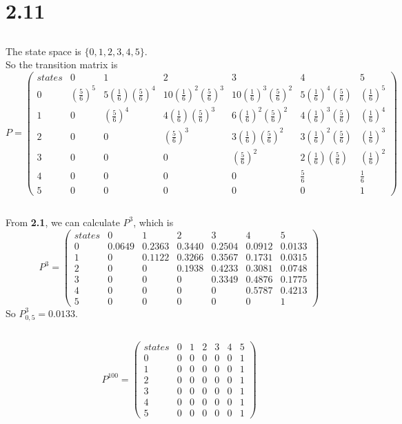 \documentclass{article}
\begin{document}
\section{2.11}
\subsection{}
The state space is $\{0, 1, 2, 3, 4, 5\}$.\\
So the transition matrix is
\begin{equation*}
    P=
    \begin{pmatrix}
    states&0&1&2&3&4&5\\
    0&(\frac{5}{6})^5&5(\frac{1}{6})(\frac{5}{6})^4&10(\frac{1}{6})^2(\frac{5}{6})^3&10(\frac{1}{6})^3(\frac{5}{6})^2&5(\frac{1}{6})^4(\frac{5}{6})&(\frac{1}{6})^5 \\
    1&0&(\frac{5}{6})^4&4(\frac{1}{6})(\frac{5}{6})^3&6(\frac{1}{6})^2(\frac{5}{6})^2&4(\frac{1}{6})^3(\frac{5}{6})&(\frac{1}{6})^4 \\
    2&0&0&(\frac{5}{6})^3&3(\frac{1}{6})(\frac{5}{6})^2&3(\frac{1}{6})^2(\frac{5}{6})&(\frac{1}{6})^3 \\
    3&0&0&0&(\frac{5}{6})^2&2(\frac{1}{6})(\frac{5}{6})&(\frac{1}{6})^2\\
    4&0&0&0&0&\frac{5}{6}&\frac{1}{6} \\
    5&0&0&0&0&0&1
    \end{pmatrix}
\end{equation*}
\subsection{}
From \textbf{2.1}, we can calculate $P^3$, which is
\begin{equation*}
    P^3=
    \begin{pmatrix}
    states&0&1&2&3&4&5\\
    0&0.0649&0.2363&0.3440&0.2504&0.0912&0.0133 \\
    1&0&0.1122&0.3266&0.3567&0.1731&0.0315 \\
    2&0&0&0.1938&0.4233&0.3081&0.0748 \\
    3&0&0&0&0.3349&0.4876&0.1775 \\
    4&0&0&0&0&0.5787&0.4213 \\
    5&0&0&0&0&0&1
    \end{pmatrix}
\end{equation*}
So $P^3_{0,5}=0.0133$.
\subsection{}
\begin{equation*}
    P^{100}=
    \begin{pmatrix}
    states&0&1&2&3&4&5\\
    0&0&0&0&0&0&1\\
    1&0&0&0&0&0&1\\
    2&0&0&0&0&0&1\\
    3&0&0&0&0&0&1\\
    4&0&0&0&0&0&1\\
    5&0&0&0&0&0&1
    \end{pmatrix}
\end{equation*}
\end{document}
